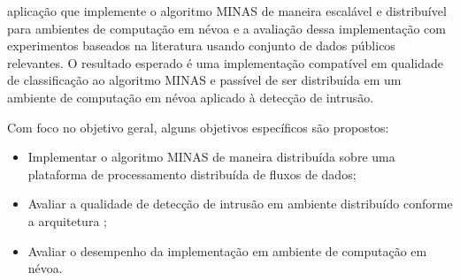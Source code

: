 aplicação que implemente o algoritmo MINAS
de maneira escalável e distribuível para ambientes de computação em névoa e a avaliação
dessa implementação com experimentos baseados na literatura usando conjunto de dados
públicos relevantes.
O resultado esperado é uma implementação compatível em qualidade de
classificação ao algoritmo MINAS e passível de ser distribuída em um ambiente
de computação em névoa aplicado à detecção de intrusão.



% 

Com foco no objetivo geral, alguns objetivos específicos são propostos:




\begin{itemize}

    \item Implementar o algoritmo MINAS de maneira distribuída sobre uma
    plataforma de processamento distribuída de fluxos de dados;

    \item Avaliar a qualidade de detecção de intrusão em ambiente distribuído 
    conforme a arquitetura \idsiot;
    
    \item Avaliar o desempenho da implementação em ambiente de computação em névoa.

\end{itemize}

